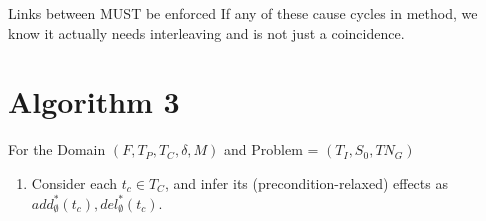Links between MUST be enforced
If any of these cause cycles in method, we know it actually needs interleaving and is not just a coincidence.

\section{Algorithm 3}
For the Domain $(F, T_P, T_C, \delta, M)$ and Problem = $(T_I, S_0, TN_G)$
\begin{enumerate}
	\item Consider each $t_c \in T_C$, and infer its (precondition-relaxed) effects as  $add^{*}_{\emptyset}(t_c), del^{*}_{\emptyset}(t_c)$.


\end{enumerate}
